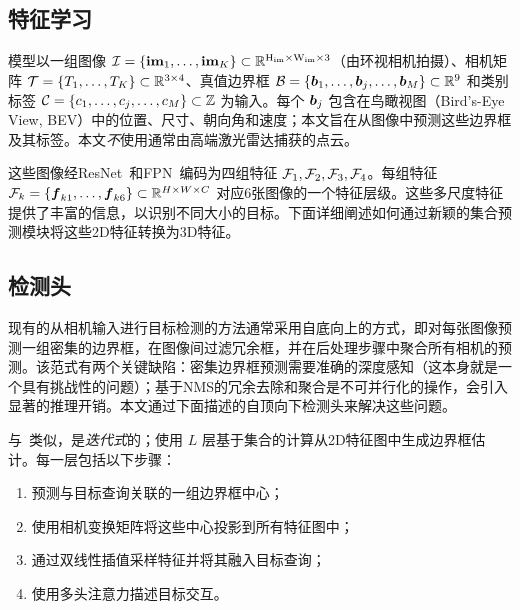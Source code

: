 \subsection{特征学习}
\label{feature-learning}
模型以一组图像 $\mathcal{I}=\{\mathrm{\mathbf{im}}_1, \ldots, \mathrm{\mathbf{im}}_K\} \subset\mathbb{R}^{\mathrm{H_{im}}\times \mathrm{W_{im}}\times3}$（由环视相机拍摄）、相机矩阵 $\mathcal{T}=\{T_1, \ldots, T_K\} \subset \mathbb{R}^{3\times4}$、真值边界框 $\mathcal{B}=\{\boldsymbol{b}_1, \ldots, \boldsymbol{b}_j, \ldots, \boldsymbol{b}_M\}\subset\mathbb{R}^9$ 和类别标签 $\mathcal{C} = \{c_1, \ldots, c_j, \ldots, c_M\}\subset\mathbb{Z}$ 为输入。每个 $\boldsymbol{b}_j$ 包含在鸟瞰视图（Bird's-Eye View, BEV）中的位置、尺寸、朝向角和速度；本文旨在从图像中预测这些边界框及其标签。本文\emph{不}使用通常由高端激光雷达捕获的点云。

这些图像经ResNet~\cite{He2015}和FPN~\cite{Lin2017}编码为四组特征 $\mathcal{F}_1, \mathcal{F}_2, \mathcal{F}_3, \mathcal{F}_4$。每组特征 $\mathcal{F}_k=\{\boldsymbol{f}_{k1}, \ldots, \boldsymbol{f}_{k6}\} \subset \mathbb{R}^{H\times W \times C}$ 对应6张图像的一个特征层级。这些多尺度特征提供了丰富的信息，以识别不同大小的目标。下面详细阐述如何通过新颖的集合预测模块将这些2D特征转换为3D特征。


\subsection{检测头}
\label{detection-head}

现有的从相机输入进行目标检测的方法通常采用自底向上的方式，即对每张图像预测一组密集的边界框，在图像间过滤冗余框，并在后处理步骤中聚合所有相机的预测。该范式有两个关键缺陷：密集边界框预测需要准确的深度感知（这本身就是一个具有挑战性的问题）；基于NMS的冗余去除和聚合是不可并行化的操作，会引入显著的推理开销。本文通过下面描述的自顶向下检测头来解决这些问题。

与~\cite{objdgcnn, zhu2021deformable}类似，\name 是\emph{迭代式}的；使用 $L$ 层基于集合的计算从2D特征图中生成边界框估计。每一层包括以下步骤：
\begin{enumerate}
    \item 预测与目标查询关联的一组边界框中心；
    \item 使用相机变换矩阵将这些中心投影到所有特征图中；
    \item 通过双线性插值采样特征并将其融入目标查询；
    \item 使用多头注意力描述目标交互。
\end{enumerate}


